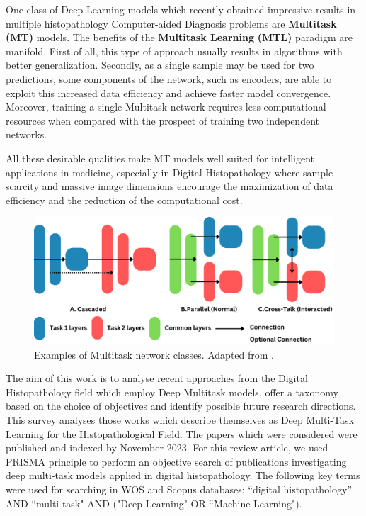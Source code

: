 \documentclass[conference]{IEEEtran}
\begin{document}
One class of Deep Learning models which recently obtained impressive results in multiple histopathology Computer-aided Diagnosis problems are \textbf{Multitask (MT)} models. The benefits of the \textbf{Multitask Learning} \textbf{(MTL)} paradigm \cite{caruana1997multitask} are manifold. First of all, this type of approach usually results in algorithms with better generalization. Secondly, as a single sample may be used for two predictions, some components of the network, such as encoders, are able to exploit this increased data efficiency and achieve faster model convergence. Moreover, training a single Multitask network requires less computational resources when compared with the prospect of training two independent networks. 

All these desirable qualities make MT models well suited for intelligent applications in medicine, especially in Digital Histopathology where sample scarcity and massive image dimensions encourage the maximization of data efficiency and the reduction of the computational cost. 

\begin{figure}[htb]
    \centering
	\centerline{\includegraphics[scale=0.3]{figures/categories_mt_nets_v2.png}}
	\caption{Examples of Multitask network classes. Adapted from \cite{zhao2023multi}.}
	\label{mt_net_categ}
\end{figure}

The aim of this work is to analyse recent approaches from the Digital Histopathology field which employ Deep Multitask models, offer a taxonomy based on the choice of objectives and identify possible future research directions. This survey analyses those works which describe themselves as Deep Multi-Task Learning for the Histopathological Field. The papers which were considered were published and indexed by November 2023. For this review article, we used PRISMA principle to perform an objective search of publications investigating deep multi-task models applied in digital histopathology. The following key terms were used for searching in WOS and Scopus databases: “digital histopathology” AND “multi-task" AND ("Deep Learning" OR “Machine Learning").
\end{document}
